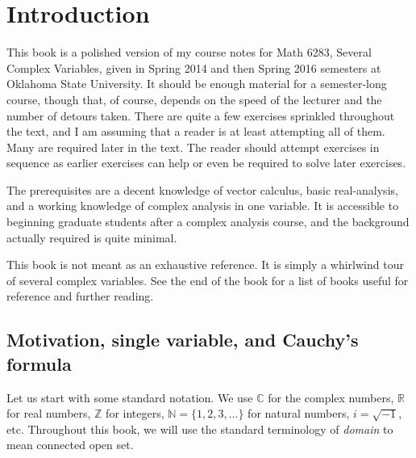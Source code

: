 \documentclass[12pt,openany]{book}
\newcommand{\C}{{\mathbb{C}}}
\newcommand{\R}{{\mathbb{R}}}
\newcommand{\Z}{{\mathbb{Z}}}
\newcommand{\N}{{\mathbb{N}}}
\newcommand{\myindex}[1]{#1\index{#1}}
\theoremstyle{plain}
\theoremstyle{remark}
\theoremstyle{definition}
\theoremstyle{exercise}
\theoremstyle{example}
\begin{document}

\chapter*{Introduction}


This book is a polished version of my course notes for Math 6283, Several
Complex Variables, given in
Spring 2014 and then Spring 2016 semesters at Oklahoma State University.
It should be enough material for a semester-long course,
though that,
of course, depends on the speed of the lecturer and the number of detours taken.
There are quite a few
exercises sprinkled throughout the text, and I am assuming that a reader is
at least attempting all of them.  Many are required later in the
text.  The reader should attempt exercises in sequence as earlier exercises
can help or even be required to solve later exercises.

The prerequisites are a decent knowledge of vector calculus, basic
real-analysis, and a working knowledge of complex analysis in one variable.
It is accessible to beginning graduate students after a complex
analysis course, and the background actually required is quite minimal.

This book is not meant as an exhaustive reference.  It is simply a whirlwind
tour of several complex variables.  See the end of the book
for a list of books useful for
reference and further reading.


\section{Motivation, single variable, and Cauchy's formula} \label{sec:motivation}


Let us start with some standard notation.
We use  $\C$ for the complex numbers,  $\R$
for real numbers,
 $\Z$ for integers,
 $\N = \{ 1,2,3,\ldots \}$ for natural
numbers,
 $i = \sqrt{-1}$, etc.  Throughout this book, we will use
the standard terminology of \emph{\myindex{domain}} to mean connected open
set.
\end{document}
